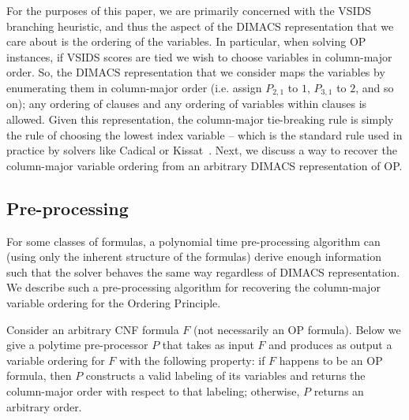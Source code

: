 \documentclass[a4paper,UKenglish,cleveref, autoref, thm-restate]{lipics-v2021}
\begin{document}
For the purposes of this paper, we are primarily concerned with the VSIDS branching heuristic, and thus the aspect of the DIMACS representation that we care about is the ordering of the variables. In particular, when solving OP instances, if VSIDS scores are tied we wish to choose variables in column-major order. So, the DIMACS representation that we consider maps the variables by enumerating them in column-major order (i.e. assign $P_{2, 1}$ to $1$, $P_{3, 1}$ to $2$, and so on); any ordering of clauses and any ordering of variables within clauses is allowed. Given this representation, the column-major tie-breaking rule is simply the rule of choosing the lowest index variable -- which is the standard rule used in practice by solvers like Cadical or Kissat~\cite{DBLP:conf/sat/BiereF15}. 
Next, we discuss a way to recover the column-major variable ordering from an arbitrary DIMACS representation of OP.

\subsection{Pre-processing}
\label{sec:preprocessing}
For some classes of formulas, a polynomial time pre-processing algorithm can (using only the inherent structure of the formulas) derive enough information such that the solver behaves the same way regardless of DIMACS representation. We describe such a pre-processing algorithm for recovering the column-major variable ordering for the Ordering Principle.

Consider an arbitrary CNF formula $F$ (not necessarily an OP formula). Below we give a polytime pre-processor $P$ that takes as input $F$ and produces as output a variable ordering for $F$ with the following property: if $F$ happens to be an OP formula, then $P$ constructs a valid labeling of its variables and returns the column-major order with respect to that labeling; otherwise, $P$ returns an arbitrary order. 
\end{document}

